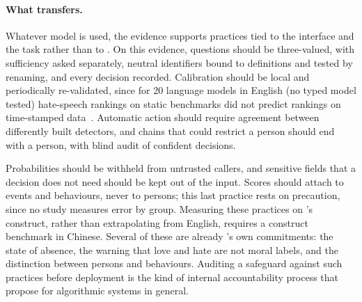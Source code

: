 \paragraph{What transfers.}
Whatever model is used, the evidence supports practices tied to the interface and the task rather than to \jev{}.
On this evidence, questions should be three-valued, with sufficiency asked separately, neutral identifiers bound to definitions and tested by renaming, and every decision recorded.
Calibration should be local and periodically re-validated, since for 20 language models in English (no typed model tested) hate-speech rankings on static benchmarks did not predict rankings on time-stamped data~\cite{dibonaventura2025hatevolution}.
Automatic action should require agreement between differently built detectors, and chains that could restrict a person should end with a person, with blind audit of confident decisions.

Probabilities should be withheld from untrusted callers, and sensitive fields that a decision does not need should be kept out of the input.
Scores should attach to events and behaviours, never to persons; this last practice rests on precaution, since no study measures error by group.
Measuring these practices on \pol{}'s construct, rather than extrapolating from English, requires a construct benchmark in Chinese.
Several of these are already \pol{}'s own commitments: the state of absence, the warning that love and hate are not moral labels, and the distinction between persons and behaviours.
Auditing a safeguard against such practices before deployment is the kind of internal accountability process that \citet{raji2020closing} propose for algorithmic systems in general.
